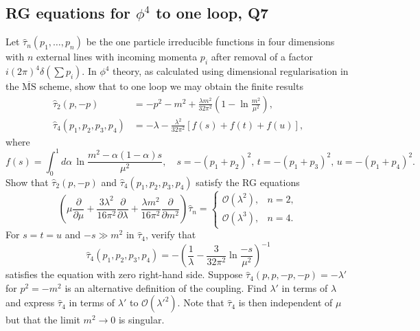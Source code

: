 \subsection{RG equations for $\phi^4$ to one loop, Q7}
Let $\hat\tau_n(p_1,\ldots,p_n)$ be the one particle irreducible functions in four dimensions with $n$ external lines with incoming momenta $p_i$ after removal of a factor $i(2\pi)^4\delta(\sum p_i)$. In $\phi^4$ theory, as calculated using dimensional regularisation in the $\overline{\mathrm{MS}}$ scheme, show that to one loop we may obtain the finite results
\begin{align}
    \hat\tau_2(p,-p) &= -p^2 - m^2 + \frac{\lambda m^2}{32\pi^2}\!\left(1 - \ln\frac{m^2}{\mu^2}\right), \\
    \hat\tau_4(p_1,p_2,p_3,p_4) &= -\lambda - \frac{\lambda^2}{32\pi^2}\!\left[f(s) + f(t) + f(u)\right],
\end{align}
where
\begin{equation}
    f(s) = \int_0^1 d\alpha\,\ln\frac{m^2 - \alpha(1-\alpha)s}{\mu^2},\quad s = -(p_1+p_2)^2,\,t = -(p_1+p_3)^2,\,u = -(p_1+p_4)^2.
\end{equation}
Show that $\hat\tau_2(p,-p)$ and $\hat\tau_4(p_1,p_2,p_3,p_4)$ satisfy the RG equations
\begin{equation}
    \left(\mu\frac{\partial}{\partial\mu} + \frac{3\lambda^2}{16\pi^2}\frac{\partial}{\partial\lambda} + \frac{\lambda m^2}{16\pi^2}\frac{\partial}{\partial m^2}\right)\hat\tau_n = \begin{cases}\mathcal{O}(\lambda^2), & n=2,\\ \mathcal{O}(\lambda^3), & n=4.\end{cases}
\end{equation}
For $s = t = u$ and $-s \gg m^2$ in $\hat\tau_4$, verify that
\begin{equation}
    \hat\tau_4(p_1,p_2,p_3,p_4) = -\!\left(\frac{1}{\lambda} - \frac{3}{32\pi^2}\ln\frac{-s}{\mu^2}\right)^{-1}
\end{equation}
satisfies the equation with zero right-hand side. Suppose $\hat\tau_4(p,p,-p,-p) = -\lambda'$ for $p^2 = -m^2$ is an alternative definition of the coupling. Find $\lambda'$ in terms of $\lambda$ and express $\hat\tau_4$ in terms of $\lambda'$ to $\mathcal{O}(\lambda'^2)$. Note that $\hat\tau_4$ is then independent of $\mu$ but that the limit $m^2\to 0$ is singular.

